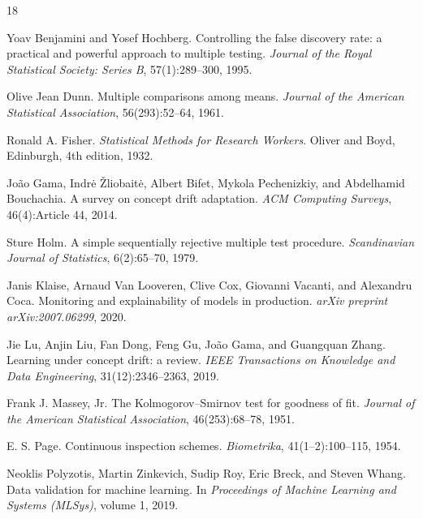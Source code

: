 \documentclass[11pt]{article}
\begin{document}

\begin{thebibliography}{18}

Yoav Benjamini and Yosef Hochberg.
\newblock Controlling the false discovery rate: a practical and powerful approach to multiple testing.
\newblock \emph{Journal of the Royal Statistical Society: Series B}, 57(1):289--300, 1995.

Olive Jean Dunn.
\newblock Multiple comparisons among means.
\newblock \emph{Journal of the American Statistical Association}, 56(293):52--64, 1961.

Ronald A. Fisher.
\newblock \emph{Statistical Methods for Research Workers}.
\newblock Oliver and Boyd, Edinburgh, 4th edition, 1932.

Jo{\~a}o Gama, Indr{\.e} {\v{Z}}liobait{\.e}, Albert Bifet, Mykola Pechenizkiy, and Abdelhamid Bouchachia.
\newblock A survey on concept drift adaptation.
\newblock \emph{ACM Computing Surveys}, 46(4):Article 44, 2014.

Sture Holm.
\newblock A simple sequentially rejective multiple test procedure.
\newblock \emph{Scandinavian Journal of Statistics}, 6(2):65--70, 1979.

Janis Klaise, Arnaud Van Looveren, Clive Cox, Giovanni Vacanti, and Alexandru Coca.
\newblock Monitoring and explainability of models in production.
\newblock \emph{arXiv preprint arXiv:2007.06299}, 2020.

Jie Lu, Anjin Liu, Fan Dong, Feng Gu, Jo{\~a}o Gama, and Guangquan Zhang.
\newblock Learning under concept drift: a review.
\newblock \emph{IEEE Transactions on Knowledge and Data Engineering}, 31(12):2346--2363, 2019.

Frank J. Massey, Jr.
\newblock The Kolmogorov--Smirnov test for goodness of fit.
\newblock \emph{Journal of the American Statistical Association}, 46(253):68--78, 1951.

E. S. Page.
\newblock Continuous inspection schemes.
\newblock \emph{Biometrika}, 41(1--2):100--115, 1954.

Neoklis Polyzotis, Martin Zinkevich, Sudip Roy, Eric Breck, and Steven Whang.
\newblock Data validation for machine learning.
\newblock In \emph{Proceedings of Machine Learning and Systems (MLSys)}, volume 1, 2019.


\end{thebibliography}
\end{document}
